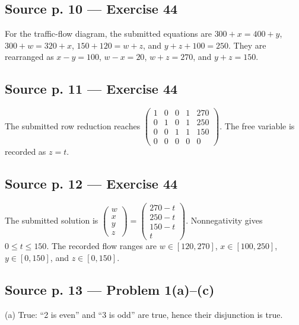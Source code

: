 \subsection{Source p. 10 --- Exercise 44}

For the traffic-flow diagram, the submitted equations are \(300 + x = 400 + y\), \(300 + w = 320 + x\), \(150 + 120 = w + z\), and \(y + z + 100 = 250\). They are rearranged as \(x - y = 100\), \(w - x = 20\), \(w + z = 270\), and \(y + z = 150\).

\subsection{Source p. 11 --- Exercise 44}

The submitted row reduction reaches \(\begin{pmatrix}
1 & 0 & 0 & 1 & 270 \\
0 & 1 & 0 & 1 & 250 \\
0 & 0 & 1 & 1 & 150 \\
0 & 0 & 0 & 0 & 0
\end{pmatrix}\). The free variable is recorded as \(z = t\).

\subsection{Source p. 12 --- Exercise 44}

The submitted solution is \(\begin{pmatrix}
w \\
x \\
y \\
z
\end{pmatrix} = \begin{pmatrix}
{270 - t} \\
{250 - t} \\
{150 - t} \\
t
\end{pmatrix}\). Nonnegativity gives \(0 \leq t \leq 150\). The recorded flow ranges are \(w \in \left\lbrack {120,270} \right\rbrack\), \(x \in \left\lbrack {100,250} \right\rbrack\), \(y \in \left\lbrack {0,150} \right\rbrack\), and \(z \in \left\lbrack {0,150} \right\rbrack\).

\subsection{Source p. 13 --- Problem 1(a)--(c)}

(a) True: ``2 is even'' and ``3 is odd'' are true, hence their disjunction is true.

